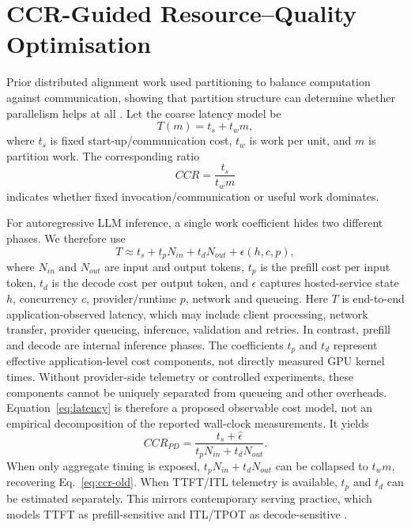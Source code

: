 \documentclass[conference]{IEEEtran}
\begin{document}
\section{CCR-Guided Resource--Quality Optimisation}
Prior distributed alignment work used partitioning to balance computation against communication, showing that partition structure can determine whether parallelism helps at all \cite{helal2008parallel,helal2009search}. Let the coarse latency model be
\begin{equation}
T(m) = t_s+t_w m,
\end{equation}
where $t_s$ is fixed start-up/communication cost, $t_w$ is work per unit, and $m$ is partition work. The corresponding ratio
\begin{equation}
CCR = \frac{t_s}{t_wm}
\label{eq:ccr-old}
\end{equation}
indicates whether fixed invocation/communication or useful work dominates.

For autoregressive LLM inference, a single work coefficient hides two different phases. We therefore use
\begin{equation}
T \approx t_s + t_p N_{in} + t_d N_{out} + \epsilon(h,c,p),
\label{eq:latency}
\end{equation}
where $N_{in}$ and $N_{out}$ are input and output tokens, $t_p$ is the prefill cost per input token, $t_d$ is the decode cost per output token, and $\epsilon$ captures hosted-service state $h$, concurrency $c$, provider/runtime $p$, network and queueing. Here $T$ is end-to-end application-observed latency, which may include client processing, network transfer, provider queueing, inference, validation and retries. In contrast, prefill and decode are internal inference phases. The coefficients $t_p$ and $t_d$ represent effective application-level cost components, not directly measured GPU kernel times. Without provider-side telemetry or controlled experiments, these components cannot be uniquely separated from queueing and other overheads. Equation~\ref{eq:latency} is therefore a proposed observable cost model, not an empirical decomposition of the reported wall-clock measurements. It yields
\begin{equation}
CCR_{PD} = \frac{t_s+\hat{\epsilon}}{t_pN_{in}+t_dN_{out}}.
\label{eq:ccr-pd}
\end{equation}
When only aggregate timing is exposed, $t_pN_{in}+t_dN_{out}$ can be collapsed to $t_wm$, recovering Eq.~\ref{eq:ccr-old}. When TTFT/ITL telemetry is available, $t_p$ and $t_d$ can be estimated separately. This mirrors contemporary serving practice, which models TTFT as prefill-sensitive and ITL/TPOT as decode-sensitive \cite{zhong2024distserve,nvidiaDynamoProfiler}.
\end{document}
